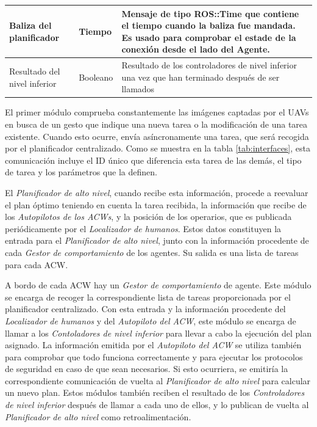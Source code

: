 \documentclass[fontsize=11pt, English=false, Español=true, Myfinal=true, twoside, numbers=noenddot]{scrbook}
\begin{document}
{\begin{table}[htb]
\begin{tabular}{|p{}|p{}|p{}|}
	    Baliza del planificador & Tiempo & Mensaje de tipo ROS::Time que contiene el tiempo cuando la baliza fue mandada. Es usado para comprobar el estade de la conexión desde el lado del Agente. \\ \hline
      
      Resultado del nivel inferior & Booleano & Resultado de los controladores de nivel inferior una vez que han terminado después de ser llamados \\ \hline
      
    \end{tabular}
\end{table}

El primer módulo comprueba constantemente las imágenes captadas por el \glspl{UAV} en busca de un gesto que indique una nueva tarea o la modificación de una tarea existente. Cuando esto ocurre, envía asíncronamente una tarea, que será recogida por el planificador centralizado. Como se muestra en la tabla \ref{tab:interfaces}, esta comunicación incluye el \gls{ID} único que diferencia esta tarea de las demás, el tipo de tarea y los parámetros que la definen.

El \emph{Planificador de alto nivel}, cuando recibe esta información, procede a reevaluar el plan óptimo teniendo en cuenta la tarea recibida, la información que recibe de los \emph{Autopilotos de los \glspl{ACW}}, y la posición de los operarios, que es publicada periódicamente por el \emph{Localizador de humanos}. Estos datos constituyen la entrada para el \emph{Planificador de alto nivel}, junto con la información procedente de cada \emph{Gestor de comportamiento} de los agentes. Su salida es una lista de tareas para cada \gls{ACW}.

A bordo de cada \gls{ACW} hay un \emph{Gestor de comportamiento} de agente. Este módulo se encarga de recoger la correspondiente lista de tareas proporcionada por el planificador centralizado. Con esta entrada y la información procedente del \emph{Localizador de humanos} y del \emph{Autopiloto del \gls{ACW}}, este módulo se encarga de llamar a los \emph{Contoladores de nivel inferior} para llevar a cabo la ejecución del plan asignado. La información emitida por el \emph{Autopiloto del \gls{ACW}} se utiliza también para comprobar que todo funciona correctamente y para ejecutar los protocolos de seguridad en caso de que sean necesarios. Si esto ocurriera, se emitiría la correspondiente comunicación de vuelta al \emph{Planificador de alto nivel} para calcular un nuevo plan. Estos módulos también reciben el resultado de los \emph{Controladores de nivel inferior} después de llamar a cada uno de ellos, y lo publican de vuelta al \emph{Planificador de alto nivel} como retroalimentación.

}
\end{document}
